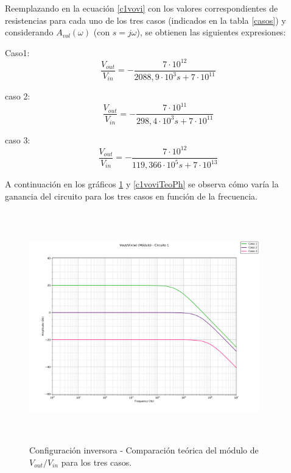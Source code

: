 Reemplazando en la ecuaci\'on \ref{c1vovi} con los valores correspondientes de resistencias para cada uno de los tres casos (indicados en la tabla \ref{casos}) y  considerando $A_{vol}(\omega)$ (con $s = j\omega$), se obtienen las siguientes expresiones:

Caso1:
\begin{equation}
	\frac{V_{out}}{V_{in}} = - \frac{7\cdot10^{12}}{2088,9 \cdot 10^3 s + 7 \cdot 10^{11}}
	\label{c1c1vovi}
\end{equation}

caso 2:
\begin{equation}
	\frac{V_{out}}{V_{in}} = - \frac{7 \cdot 10^{11}}{298,4 \cdot 10^{3} s +7 \cdot 10^{11}}
	\label{c1c2vovi}
\end{equation}

caso 3:
\begin{equation}
	\frac{V_{out}}{V_{in}} = - \frac{7 \cdot 10^{12}}{119,366 \cdot 10^{5} s +7 \cdot 10^{13}}
	\label{c1c3vovi}
\end{equation}

A continuaci\'on en los gr\'aficos \ref{c1voviTeoMod} y \ref{c1voviTeoPh} se observa c\'omo var\'ia la ganancia del circuito para los tres casos en funci\'on de la frecuencia.

\begin{figure}[H] %
	\centering
	\includegraphics[width=10cm,height=10cm,keepaspectratio]{../EJ1/00GRAFICOS/teoricos/circ1voviw.png}
	\caption{Configuración inversora - Comparaci\'on te\'orica del m\'odulo de $V_{out}/V_{in}$ para los tres casos.}
	\label{c1voviTeoMod}
\end{figure}

